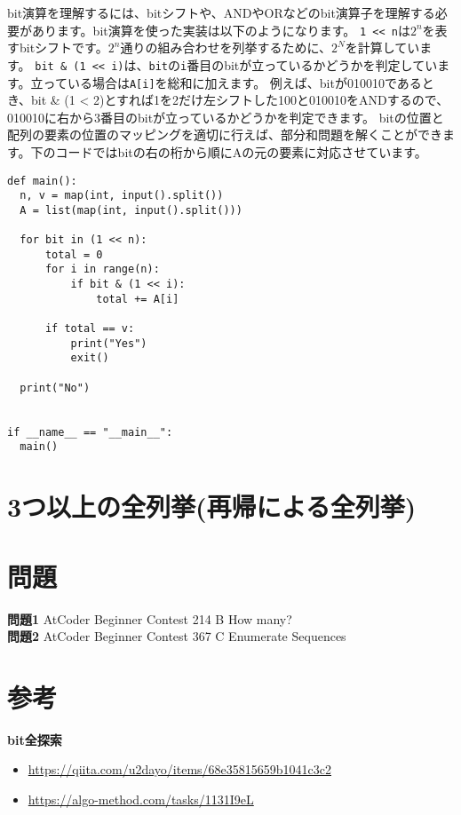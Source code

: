 \documentclass{jlreq}
\begin{document}
bit演算を理解するには、bitシフトや、ANDやORなどのbit演算子を理解する必要があります。bit演算を使った実装は以下のようになります。
\texttt{1 << n}は$2^n$を表すbitシフトです。$2^n$通りの組み合わせを列挙するために、$2^N$を計算しています。
\texttt{bit \& (1 << i)}は、\texttt{bit}の\texttt{i}番目のbitが立っているかどうかを判定しています。立っている場合は\texttt{A[i]}を総和に加えます。
例えば、bitが010010であるとき、bit \& (1 < 2)とすれば1を2だけ左シフトした100と010010をANDするので、010010に右から3番目のbitが立っているかどうかを判定できます。
bitの位置と配列の要素の位置のマッピングを適切に行えば、部分和問題を解くことができます。下のコードではbitの右の桁から順にAの元の要素に対応させています。

\begin{lstlisting}[caption=bit演算を使ったbit全探索, label=bit_search, frame=TRBL]
def main():
  n, v = map(int, input().split())
  A = list(map(int, input().split()))
  
  for bit in (1 << n):
      total = 0
      for i in range(n):
          if bit & (1 << i):
              total += A[i]
      
      if total == v:
          print("Yes")
          exit()
  
  print("No")
              

if __name__ == "__main__":
  main()
\end{lstlisting}

\section{3つ以上の全列挙(再帰による全列挙)}

\section{問題}

\textbf{問題1} AtCoder Beginner Contest 214 B How many?\\
\textbf{問題2}  AtCoder Beginner Contest 367 C Enumerate Sequences \\


\section{参考}
\textbf{bit全探索}
\begin{itemize}
	\item \url{https://qiita.com/u2dayo/items/68e35815659b1041c3c2}
	\item \url{https://algo-method.com/tasks/1131I9eL}
\end{itemize}
\end{document}
